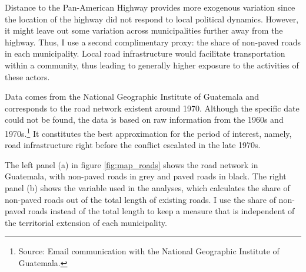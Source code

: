 \documentclass[12pt, notitlepage]{article}
\begin{document}
Distance to the Pan-American Highway provides more exogenous variation since the location of the highway did not respond to local political dynamics.
However, it might leave out some variation across municipalities further away from the highway.
Thus, I use a second complimentary proxy: the share of non-paved roads in each municipality.
Local road infrastructure would facilitate transportation within a community, thus leading to generally higher exposure to the activities of these actors.

Data comes from the National Geographic Institute of Guatemala \citep{Segeplan:2019aa} and corresponds to the road network existent around 1970.
Although the specific date could not be found, the data is based on raw information from the 1960s and 1970s.\footnote{Source: Email communication with the National Geographic Institute of Guatemala.}
It constitutes the best approximation for the period of interest, namely, road infrastructure right before the conflict escalated in the late 1970s.

The left panel (a) in figure \ref{fig:map_roads} shows the road network in Guatemala, with non-paved roads in grey and paved roads in black.
The right panel (b) shows the variable used in the analyses, which calculates the share of non-paved roads out of the total length of existing roads.
I use the share of non-paved roads instead of the total length to keep a measure that is independent of the territorial extension of each municipality.
\end{document}
